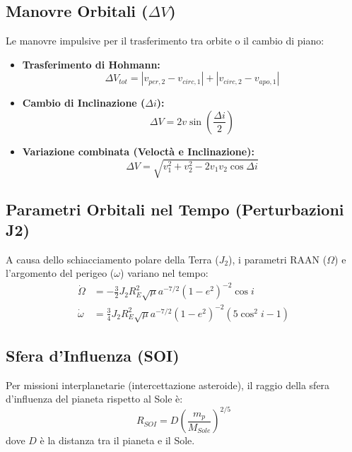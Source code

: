 \documentclass[12pt, a4paper]{article}
\begin{document}
\begin{itemize}
\subsection{Manovre Orbitali ($\Delta V$)}
Le manovre impulsive per il trasferimento tra orbite o il cambio di piano:
\begin{itemize}
    \item \textbf{Trasferimento di Hohmann:}
    \begin{equation*}
        \Delta V_{tot} = |v_{per,2} - v_{circ,1}| + |v_{circ,2} - v_{apo,1}|
    \end{equation*}
    \item \textbf{Cambio di Inclinazione ($\Delta i$):}
    \begin{equation*}
        \Delta V = 2 v \sin\left(\frac{\Delta i}{2}\right)
    \end{equation*}
    \item \textbf{Variazione combinata (Veloctà e Inclinazione):}
    \begin{equation*}
        \Delta V = \sqrt{v_1^2 + v_2^2 - 2 v_1 v_2 \cos \Delta i}
    \end{equation*}
\end{itemize}

\subsection{Parametri Orbitali nel Tempo (Perturbazioni J2)}
A causa dello schiacciamento polare della Terra ($J_2$), i parametri RAAN ($\Omega$) e l'argomento del perigeo ($\omega$) variano nel tempo:
\begin{align*}
    \dot{\Omega} &= -\frac{3}{2} J_2 R_E^2 \sqrt{\mu} a^{-7/2} (1-e^2)^{-2} \cos i \\
    \dot{\omega} &= \frac{3}{4} J_2 R_E^2 \sqrt{\mu} a^{-7/2} (1-e^2)^{-2} (5\cos^2 i - 1)
\end{align*}

\subsection{Sfera d'Influenza (SOI)}
Per missioni interplanetarie (intercettazione asteroide), il raggio della sfera d'influenza del pianeta rispetto al Sole è:
\begin{equation*}
    R_{SOI} = D \left( \frac{m_{p}}{M_{Sole}} \right)^{2/5}
\end{equation*}
dove $D$ è la distanza tra il pianeta e il Sole.
\end{itemize}
\end{document}
